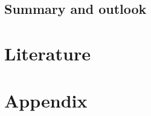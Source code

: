 \documentclass[a4paper,10pt,twoside]{article}
\begin{document}
		\subsection{Summary and outlook}
		
	\section{Literature}

		
		
		
	\section{Appendix}
\end{document}

